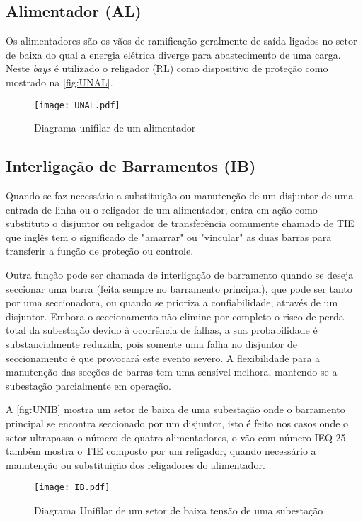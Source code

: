 		\subsection{Alimentador (AL)}
			Os alimentadores são os vãos de ramificação geralmente de saída ligados no setor de baixa do qual a energia elétrica diverge para abastecimento de uma carga. Neste \textit{bays} é utilizado o religador (RL) como dispositivo de proteção como mostrado na \autoref{fig:UNAL}.\par
			\begin{figure}[!b]
				\caption{Diagrama unifilar de um alimentador}
				\centering
				\texttt{[image: UNAL.pdf]}
				\label{fig:UNAL}
				\end{figure}
		\subsection{Interligação de Barramentos (IB)}
			\label{sec:IB}
			Quando se faz necessário a substituição ou manutenção de um disjuntor de uma entrada de linha ou o religador de um alimentador, entra em ação como substituto o disjuntor ou religador de transferência comumente chamado de TIE que inglês tem o significado de "amarrar" ou "vincular" as duas barras para transferir a função de proteção ou controle.\par
			Outra função pode ser chamada de interligação de barramento quando se deseja seccionar uma barra (feita sempre no barramento principal), que pode ser tanto por uma seccionadora, ou quando se prioriza a confiabilidade, através de um disjuntor. Embora o seccionamento não elimine por completo o risco de perda total da subestação devido à ocorrência de falhas, a sua probabilidade é substancialmente reduzida, pois somente uma falha no disjuntor de seccionamento é que provocará este evento severo. A flexibilidade para a manutenção das secções de barras tem uma sensível melhora, mantendo-se a subestação parcialmente em operação.\par
			A \autoref{fig:UNIB} mostra um setor de baixa de uma subestação onde o barramento principal se encontra seccionado por um disjuntor, isto é feito nos casos onde o setor ultrapassa o número de quatro alimentadores, o vão com número IEQ 25 também mostra o TIE composto por um religador, quando necessário a manutenção ou substituição dos religadores do alimentador.\par
			\begin{figure}[!htb]
				\caption{Diagrama Unifilar de um setor de baixa tensão de uma subestação}
				\centering
				\texttt{[image: IB.pdf]}
				\label{fig:UNIB}
				\end{figure}			
